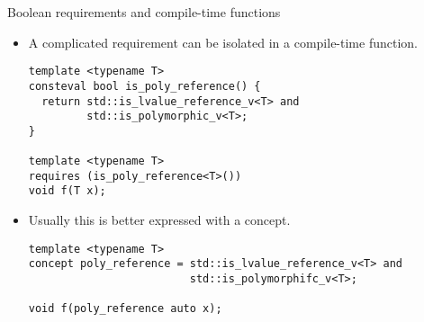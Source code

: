 \begin{frame}[t,fragile]{Boolean requirements and compile-time functions}
\begin{itemize}
  \item A complicated requirement can be isolated in a compile-time
        function.
\begin{lstlisting}
template <typename T>
consteval bool is_poly_reference() {
  return std::is_lvalue_reference_v<T> and
         std::is_polymorphic_v<T>;
}

template <typename T>
requires (is_poly_reference<T>())
void f(T x);
\end{lstlisting}

  \item Usually this is better expressed with a concept.
\begin{lstlisting}
template <typename T>
concept poly_reference = std::is_lvalue_reference_v<T> and
                         std::is_polymorphifc_v<T>;

void f(poly_reference auto x);
\end{lstlisting}
\end{itemize}
\end{frame}
